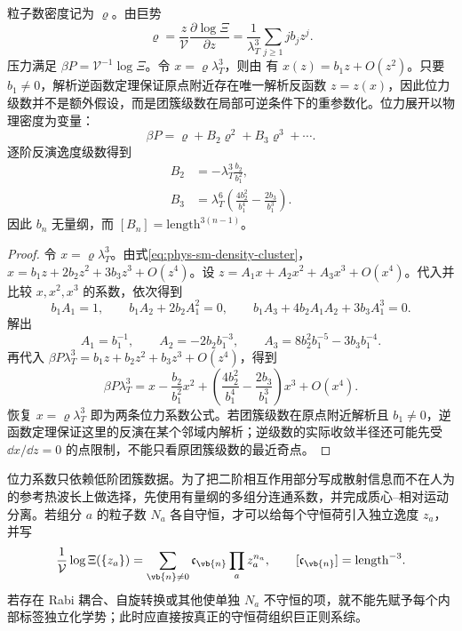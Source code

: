 粒子数密度记为 \(\varrho\)。由巨势
\begin{equation}
 \varrho
 =\frac{z}{\mathcal V}\frac{\partial\log\Xi}{\partial z}
 =\frac{1}{\lambda_T^3}
 \sum_{j\ge1}j b_jz^j.
 \label{eq:phys-sm-density-cluster}
\end{equation}
压力满足 \(\beta P=\mathcal V^{-1}\log\Xi\)。令 \(x=\varrho\lambda_T^3\)，则由 有 \(x(z)=b_1z+O(z^2)\)。只要 \(b_1\neq0\)，解析逆函数定理保证原点附近存在唯一解析反函数 \(z=z(x)\)，因此位力级数并不是额外假设，而是团簇级数在局部可逆条件下的重参数化。位力展开以物理密度为变量：
\begin{equation}
 \beta P
 =\varrho+B_2\varrho^2+B_3\varrho^3+\cdots.
 \label{eq:phys-sm-virial-definition}
\end{equation}
逐阶反演逸度级数得到
\begin{align}
 B_2&=-\lambda_T^3\frac{b_2}{b_1^2},
 \label{eq:phys-sm-virial-b2}\\
 B_3&=\lambda_T^6
 \left(
 \frac{4b_2^2}{b_1^4}
 -\frac{2b_3}{b_1^3}
 \right).
 \label{eq:phys-sm-virial-b3}
\end{align}
因此 \(b_n\) 无量纲，而 \([B_n]=\text{length}^{3(n-1)}\)。

\begin{proof}
令 \(x=\varrho\lambda_T^3\)。由式\cref{eq:phys-sm-density-cluster}，
\(x=b_1z+2b_2z^2+3b_3z^3+O(z^4)\)。设
\(z=A_1x+A_2x^2+A_3x^3+O(x^4)\)。代入并比较 \(x,x^2,x^3\) 的系数，依次得到
\[
b_1A_1=1,\qquad
b_1A_2+2b_2A_1^2=0,\qquad
b_1A_3+4b_2A_1A_2+3b_3A_1^3=0.
\]
解出
\[
A_1=b_1^{-1},\qquad
A_2=-2b_2b_1^{-3},\qquad
A_3=8b_2^2b_1^{-5}-3b_3b_1^{-4}.
\]
再代入 \(\beta P\lambda_T^3=b_1z+b_2z^2+b_3z^3+O(z^4)\)，得到
\[
\beta P\lambda_T^3
=x-\frac{b_2}{b_1^2}x^2
+\left(\frac{4b_2^2}{b_1^4}
-\frac{2b_3}{b_1^3}\right)x^3+O(x^4).
\]
恢复 \(x=\varrho\lambda_T^3\) 即为两条位力系数公式。若团簇级数在原点附近解析且 \(b_1\ne0\)，逆函数定理保证这里的反演在某个邻域内解析；逆级数的实际收敛半径还可能先受 \(\dd x/\dd z=0\) 的点限制，不能只看原团簇级数的最近奇点。
\end{proof}

位力系数只依赖低阶团簇数据。为了把二阶相互作用部分写成散射信息而不在人为的参考热波长上做选择，先使用有量纲的多组分连通系数，并完成质心--相对运动分离。若组分 \(a\) 的粒子数 \(N_a\) 各自守恒，才可以给每个守恒荷引入独立逸度 \(z_a\)，并写
\begin{equation}
 \frac1{\mathcal V}\log\Xi(\{z_a\})
 =\sum_{\vb{n}\neq0}
 \mathfrak c_{\vb{n}}
 \prod_a z_a^{n_a},
 \qquad
 [\mathfrak c_{\vb{n}}]=\text{length}^{-3}.
 \label{eq:phys-sm-multicomponent-cluster}
\end{equation}
若存在 Rabi 耦合、自旋转换或其他使单独 \(N_a\) 不守恒的项，就不能先赋予每个内部标签独立化学势；此时应直接按真正的守恒荷组织巨正则系综。

